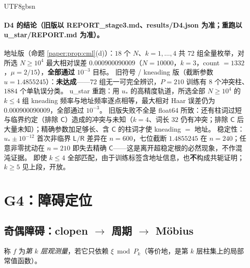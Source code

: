 \documentclass[11pt,a4paper]{article}
\newcommand{\Haar}{\mu}
\newcommand{\Lsym}{\ensuremath{\mathsf{L}}}
\newcommand{\Rsym}{\ensuremath{\mathsf{R}}}
\newcommand{\ust}{u_{*}}               %
\theoremstyle{plain}
\theoremstyle{definition}
\begin{document}
\begin{CJK}{UTF8}{gbsn}
\paragraph{D4 的结论（旧版以 REPORT\_stage3.md、results/D4.json 为准；重跑以 u\_star/REPORT.md 为准）。}
地址版（命题 \ref{paper:prop:cml}(d)）：$18$ 个 $N$、$k=1,\dots,4$ 共 $72$ 组全量枚举，对所选 $N\ge10^4$ 最大相对误差 $0.000900090009$（$N=10000$，$k=3$，count $=1332$，$\Haar=2/15$），\textbf{全部通过} $10^{-3}$ 目标。
旧符号 / kneading 版（截断参数 $u=1.4855245$）：\textbf{未达成}——$72$ 组无一可完全辨识，$P=210$ 训练有 $8$ 个冲突柱、$1884$ 个单轨误分类。
u\_star 重跑：用 $\ust$ 的高精度轨道，所选全部 $N\ge10^4$ 的 $k\le4$ 组 kneading 频率与地址频率逐点相等，最大相对 Haar 误差仍为 $0.000900090009$，全部通过 $10^{-3}$。
旧版失败不全是 float64 所致：还有柱词过短与临界约定（排除 $\mathsf C$）造成的冲突与未知（$k=4$、词长 $32$ 仍有冲突；排除 $\mathsf C$ 后大量未知）；精确参数加足够长、含 $\mathsf C$ 的柱词才使 kneading $=$ 地址。
稳定性：$\ust\pm10^{-12}$ 首次非临界 $\Lsym/\Rsym$ 差异在 $n=600$，七位截断 $1.4855245$ 在 $n=240$；任意非零扰动在 $n=210$ 即失去精确 $\mathsf C$——这是离开超稳定根的必然现象，不作混沌证据。
即使 $k\le4$ 全部匹配，由于训练标签含地址信息，也\textbf{不}构成共轭证明；$k\ge5$ 见上段，开放。

\section{G4：障碍定位}\label{paper:sec:G4}

\subsection{奇偶障碍：clopen $\to$ 周期 $\to$ M\"obius}

称 $f$ 为\emph{第 $k$ 层观测量}，若它只依赖 $\xi\bmod P_k$（等价地，是第 $k$ 层柱集上的局部常值函数）。


\end{CJK}
\end{document}
